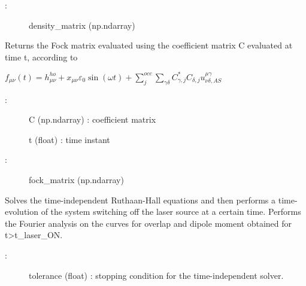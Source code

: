 \documentclass[letterpaper,10pt,english]{sphinxmanual}
\begin{document}
\begin{fulllineitems}
\begin{fulllineitems}
\begin{description}
\item[{:}] \leavevmode
density\_matrix (np.ndarray)

\end{description}

\end{fulllineitems}


\begin{fulllineitems}
\label{\detokenize{index:do.GHF.fill_fock_matrix}}
Returns the Fock matrix evaluated using the coefficient matrix C evaluated at time t, according to

\(f_{\mu\nu}(t) =  h_{\mu\nu}^{ho} + x_{\mu\nu} \varepsilon_0 \sin(\omega t) + \sum_{j}^{occ} \sum_{\gamma\delta} C_{\gamma,j}^* C_{\delta,j} u^{\mu\gamma}_{\nu\delta,AS}\)
\begin{description}
\item[{:}] \leavevmode
C (np.ndarray) : coefficient matrix

t (float) : time instant

\item[{:}] \leavevmode
fock\_matrix (np.ndarray)

\end{description}

\end{fulllineitems}


\begin{fulllineitems}
\label{\detokenize{index:do.GHF.fourier_analysis}}
Solves the time-independent Ruthaan-Hall equations and then performs a time-evolution of the system switching off the laser source at a certain time.
Performs the Fourier analysis on the curves for overlap and dipole moment obtained for t\textgreater{}t\_laser\_ON.
\begin{description}
\item[{:}] \leavevmode
tolerance (float) : stopping condition for the time-independent solver.


\end{description}
\end{fulllineitems}
\end{fulllineitems}
\end{document}
